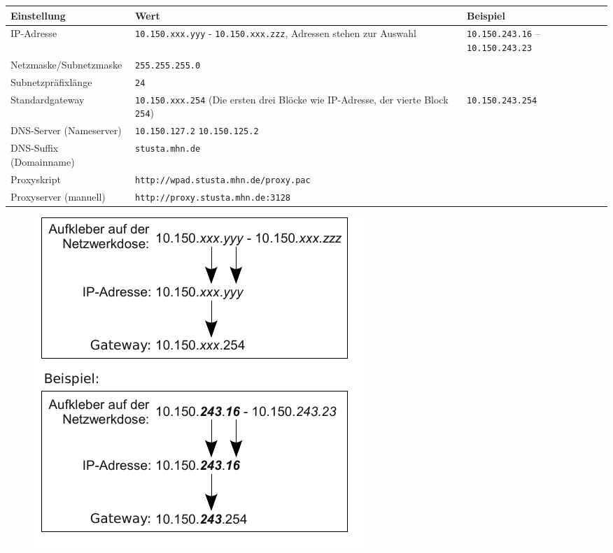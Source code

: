 \documentclass[a4paper,12pt]{scrartcl}
\begin{document}
\begin{center}
  \begin{tabularx}{\linewidth}{lXp{.2\linewidth}}
    \textbf{Einstellung} & \textbf{Wert} & \textbf{Beispiel} \\
    \midrule
    IP-Adresse & \nolinkurl{10.150.xxx.yyy} - \nolinkurl{10.150.xxx.zzz}, \newline 8 Adressen stehen zur Auswahl & \nolinkurl{10.150.243.16} – \nolinkurl{10.150.243.23} \\
    \hline
    Netzmaske/Subnetzmaske & \nolinkurl{255.255.255.0} & \\
    \hline
    Subnetzpräfixlänge & \nolinkurl{24} & \\
    \hline
    Standardgateway & \nolinkurl{10.150.xxx.254} \newline (Die ersten drei Blöcke wie IP-Adresse, der vierte Block \nolinkurl{254}) & \nolinkurl{10.150.243.254} \\
    \hline
    DNS-Server (Nameserver) & \nolinkurl{10.150.127.2} \newline \nolinkurl{10.150.125.2} & \\
    \hline
    DNS-Suffix (Domainname) & \nolinkurl{stusta.mhn.de} & \\
    \hline
    Proxyskript &{\nolinkurl{http://wpad.stusta.mhn.de/proxy.pac}} & \\ 
    \hline
    Proxyserver (manuell) & {\nolinkurl{http://proxy.stusta.mhn.de:3128}} & \\ 
    \bottomrule
  \end{tabularx}
\end{center}

\begin{figure}[h!]
		\centering
		\begin{minipage}[c]{0.4\linewidth}
			\centering
			\includegraphics[width=\linewidth,keepaspectratio]{Bilder/IP_Gerneric}
		\end{minipage}
	\end{figure}
\end{document}
